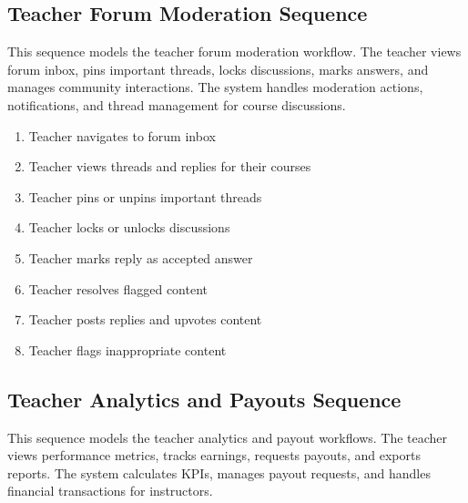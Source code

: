 
\subsection{Teacher Forum Moderation Sequence}
This sequence models the teacher forum moderation workflow. The teacher views
forum inbox, pins important threads, locks discussions, marks answers, and
manages community interactions. The system handles moderation actions,
notifications, and thread management for course discussions.

\begin{enumerate}[topsep=0pt,itemsep=1pt,parsep=0pt,partopsep=0pt]
    \item Teacher navigates to forum inbox
    \item Teacher views threads and replies for their courses
    \item Teacher pins or unpins important threads
    \item Teacher locks or unlocks discussions
    \item Teacher marks reply as accepted answer
    \item Teacher resolves flagged content
    \item Teacher posts replies and upvotes content
    \item Teacher flags inappropriate content
\end{enumerate}


\subsection{Teacher Analytics and Payouts Sequence}
This sequence models the teacher analytics and payout workflows. The teacher
views performance metrics, tracks earnings, requests payouts, and exports
reports. The system calculates KPIs, manages payout requests, and handles
financial transactions for instructors.

